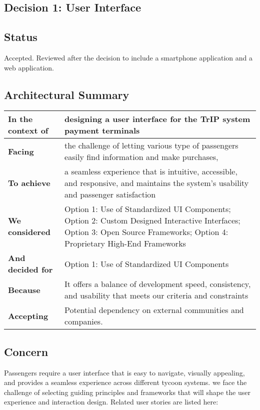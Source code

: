 \subsection{Decision 1: User Interface}

\subsection*{Status}
Accepted. 
Reviewed after the decision to include a smartphone application and a web application.

\subsection*{Architectural Summary}
\begin{tabular}{|p{3.5cm}|p{10.5cm}|}
    \hline
    \textbf{In the context of} & designing a user interface for the TrIP system payment terminals \\
    \hline
    \textbf{Facing} & the challenge of letting various type of passengers easily find information and make purchases, \\
    \hline
    \textbf{To achieve} & a seamless experience that is intuitive, accessible, and responsive, and maintains the system's usability and passenger satisfaction \\
    \hline
    \textbf{We considered} & Option 1: Use of Standardized UI Components; Option 2: Custom Designed Interactive Interfaces; Option 3: Open Source Frameworks; Option 4: Proprietary High-End Frameworks \\
    \hline
    \textbf{And decided for} & Option 1: Use of Standardized UI Components \\
    \hline
    \textbf{Because} & It offers a balance of development speed, consistency, and usability that meets our criteria and constraints \\
    \hline
    \textbf{Accepting} & Potential dependency on external communities and companies. \\
    \hline
\end{tabular}

\subsection*{Concern}
Passengers require a user interface that is easy to navigate, visually appealing, and provides a seamless experience across different tycoon systems.
we face the challenge of selecting guiding principles and frameworks that will shape the user experience and interaction design.
Related user stories are listed here:

